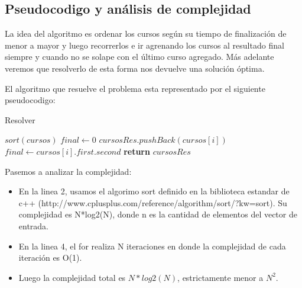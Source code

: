 \subsection{Pseudocodigo y an\'alisis de complejidad}

La idea del algoritmo es ordenar los cursos según su tiempo de finalización de menor a mayor y luego recorrerlos e ir agrenando los cursos al resultado final siempre y cuando no se solape con el último curso agregado. Más adelante veremos que resolverlo de esta forma nos devuelve una solución óptima.

El algoritmo que resuelve el problema esta representado por el siguiente pseudocodigo:

\begin{algorithm}[H]
\caption{Resolver}\label{resolver}
\begin{algorithmic}[1]
	\State $sort(cursos)$ 
	\State $final \gets 0$
		\State $ cursosRes.pushBack(cursos[i])$
		\State $final \gets cursos[i].first.second$
	\State \textbf{return} $cursosRes$
	\EndIf
	\EndFor 	
\EndProcedure		
\end{algorithmic}
\end{algorithm}

Pasemos a analizar la complejidad:

\begin{itemize}
  \item En la linea 2, usamos el algorimo sort definido en la biblioteca estandar de c++ (http://www.cplusplus.com/reference/algorithm/sort/?kw=sort).
Su complejidad es N*log2(N), donde n es la cantidad de elementos del vector de entrada.

  \item En la linea 4, el for realiza N iteraciones en donde la complejidad de cada iteración es O(1).
  \item Luego la complejidad total es $N*log2(N)$, estrictamente menor a $N^{2}$.

\end{itemize}


